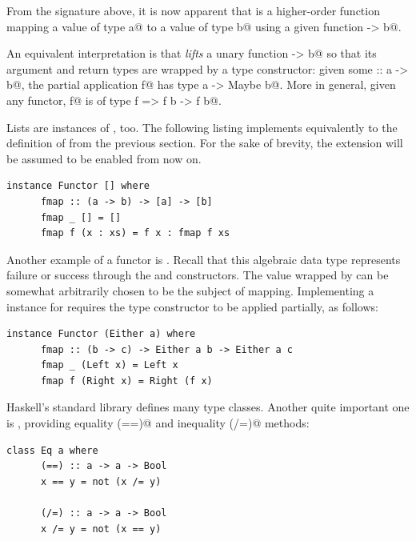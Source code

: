 \documentclass[UdineBachThesis,american,11pt]{PhdThesis}
\begin{document}
  From the signature above, it is now apparent that \lstinline@fmap@ is a
  higher-order function mapping a value of type \lstinline@Maybe a@ to a value
  of type \lstinline@Maybe b@ using a given function \lstinline@a -> b@.

  An equivalent interpretation is that \lstinline@fmap@ \emph{lifts} a unary
  function \lstinline@a -> b@ so that its argument and return types are wrapped
  by a \lstinline@Maybe@ type constructor: given some \lstinline@f :: a -> b@,
  the partial application \lstinline@fmap f@ has type
  \lstinline@Maybe a -> Maybe b@. More in general, given any functor,
  \lstinline@fmap f@ is of type \lstinline@Functor f => f b -> f b@.

  Lists are instances of \lstinline@Functor@, too. The following listing
  implements \lstinline@fmap@ equivalently to the definition of \lstinline@map@
  from the previous section. For the sake of brevity, the
  \lstinline@InstanceSigs@ extension will be assumed to be enabled from now on.

  \begin{lstlisting}[gobble=4,basicstyle=\ttfamily\small]
    instance Functor [] where
      fmap :: (a -> b) -> [a] -> [b]
      fmap _ [] = []
      fmap f (x : xs) = f x : fmap f xs
  \end{lstlisting}

  Another example of a functor is \lstinline@Either@. Recall that this algebraic
  data type represents failure or success through the \lstinline@Left@ and
  \lstinline@Right@ constructors. The value wrapped by \lstinline@Right@ can be
  somewhat arbitrarily chosen to be the subject of mapping. Implementing a
  \lstinline@Functor@ instance for requires the type constructor
  \lstinline@Either@ to be applied partially, as follows:

  \pagebreak

  \begin{lstlisting}[gobble=4,basicstyle=\ttfamily\small]
    instance Functor (Either a) where
      fmap :: (b -> c) -> Either a b -> Either a c
      fmap _ (Left x) = Left x
      fmap f (Right x) = Right (f x)
  \end{lstlisting}

  Haskell's standard library defines many type classes. Another quite important
  one is \lstinline@Eq@, providing equality \lstinline@(==)@ and inequality
  \lstinline@(/=)@ methods:

  \begin{lstlisting}[gobble=4,basicstyle=\ttfamily\small]
    class Eq a where
      (==) :: a -> a -> Bool
      x == y = not (x /= y)

      (/=) :: a -> a -> Bool
      x /= y = not (x == y)
  \end{lstlisting}
\end{document}
